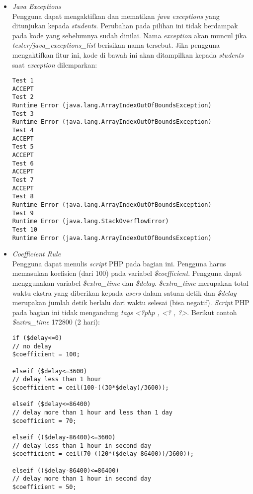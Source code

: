 \begin{itemize}
	\item \textit{Java Exceptions}\\
	Pengguna dapat mengaktifkan dan mematikan \textit{java exceptions} yang ditunjukan kepada \textit{students}. Perubahan pada pilihan ini tidak berdampak pada kode yang sebelumnya sudah dinilai. Nama \textit{exception} akan muncul jika \textit{tester/java\_exceptions\_list} berisikan nama tersebut. Jika pengguna mengaktifkan fitur ini, kode di bawah ini akan ditampilkan kepada \textit{students} saat \textit{exception} dilemparkan: \newpage
	\begin{lstlisting}[basicstyle=\ttfamily, frame=single,
columns=fullflexible, keepspaces=true, breaklines=true]
Test 1
ACCEPT
Test 2
Runtime Error (java.lang.ArrayIndexOutOfBoundsException)
Test 3
Runtime Error (java.lang.ArrayIndexOutOfBoundsException)
Test 4
ACCEPT
Test 5
ACCEPT
Test 6
ACCEPT
Test 7
ACCEPT
Test 8
Runtime Error (java.lang.ArrayIndexOutOfBoundsException)
Test 9
Runtime Error (java.lang.StackOverflowError)
Test 10
Runtime Error (java.lang.ArrayIndexOutOfBoundsException)
\end{lstlisting}
	
	\item \textit{\textit{Coefficient Rule}} \\
	Pengguna dapat menulis \textit{script} PHP pada bagian ini. Pengguna harus memasukan koefisien (dari 100) pada variabel \textit{\$coefficient}. Pengguna dapat menggunakan variabel \textit{\$extra\_time} dan \textit{\$delay}. \textit{\$extra\_time} merupakan total waktu ekstra yang diberikan kepada \textit{users} dalam satuan detik dan \textit{\$delay} merupakan jumlah detik berlalu dari waktu selesai (bisa negatif). \textit{Script} PHP pada bagian ini tidak mengandung \textit{tags <?php , <? , ?>}. Berikut contoh \textit{\$extra\_time} 172800 (2 hari):
	\begin{lstlisting}[basicstyle=\ttfamily, frame=single,
columns=fullflexible, keepspaces=true, breaklines=true]
if ($delay<=0)
// no delay
$coefficient = 100;

elseif ($delay<=3600)
// delay less than 1 hour
$coefficient = ceil(100-((30*$delay)/3600));

elseif ($delay<=86400)
// delay more than 1 hour and less than 1 day
$coefficient = 70;

elseif (($delay-86400)<=3600)
// delay less than 1 hour in second day
$coefficient = ceil(70-((20*($delay-86400))/3600));

elseif (($delay-86400)<=86400)
// delay more than 1 hour in second day
$coefficient = 50;


\end{lstlisting}
\end{itemize}
